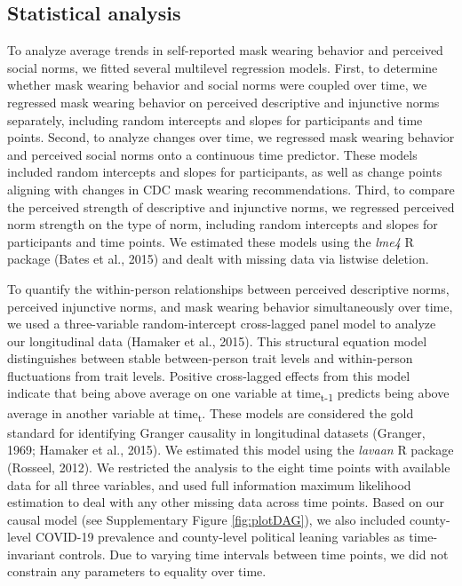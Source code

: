 \documentclass[
  english,
  man,floatsintext]{apa6}
\begin{document}
\hypertarget{statistical-analysis}{%
\subsection{Statistical analysis}\label{statistical-analysis}}

To analyze average trends in self-reported mask wearing behavior and perceived social norms, we fitted several multilevel regression models. First, to determine whether mask wearing behavior and social norms were coupled over time, we regressed mask wearing behavior on perceived descriptive and injunctive norms separately, including random intercepts and slopes for participants and time points. Second, to analyze changes over time, we regressed mask wearing behavior and perceived social norms onto a continuous time predictor. These models included random intercepts and slopes for participants, as well as change points aligning with changes in CDC mask wearing recommendations. Third, to compare the perceived strength of descriptive and injunctive norms, we regressed perceived norm strength on the type of norm, including random intercepts and slopes for participants and time points. We estimated these models using the \emph{lme4} R package (Bates et al., 2015) and dealt with missing data via listwise deletion.

To quantify the within-person relationships between perceived descriptive norms, perceived injunctive norms, and mask wearing behavior simultaneously over time, we used a three-variable random-intercept cross-lagged panel model to analyze our longitudinal data (Hamaker et al., 2015). This structural equation model distinguishes between stable between-person trait levels and within-person fluctuations from trait levels. Positive cross-lagged effects from this model indicate that being above average on one variable at time\textsubscript{t-1} predicts being above average in another variable at time\textsubscript{t}. These models are considered the gold standard for identifying Granger causality in longitudinal datasets (Granger, 1969; Hamaker et al., 2015). We estimated this model using the \emph{lavaan} R package (Rosseel, 2012). We restricted the analysis to the eight time points with available data for all three variables, and used full information maximum likelihood estimation to deal with any other missing data across time points. Based on our causal model (see Supplementary Figure \ref{fig:plotDAG}), we also included county-level COVID-19 prevalence and county-level political leaning variables as time-invariant controls. Due to varying time intervals between time points, we did not constrain any parameters to equality over time.
\end{document}
